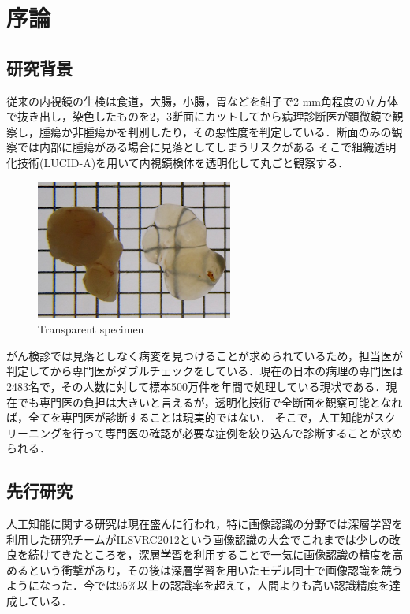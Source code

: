 \chapter{序論}
\label{chap_intro}

\section{研究背景}
従来の内視鏡の生検は食道，大腸，小腸，胃などを鉗子で2 mm角程度の立方体で抜き出し，染色したものを2，3断面にカットしてから病理診断医が顕微鏡で観察し，腫瘍か非腫瘍かを判別したり，その悪性度を判定している．断面のみの観察では内部に腫瘍がある場合に見落としてしまうリスクがある
そこで組織透明化技術(LUCID-A)\cite{sekitani2016ultraflexible}を用いて内視鏡検体を透明化して丸ごと観察する．

\begin{figure}[H]
	\centering
	\includegraphics[width=0.7\linewidth]{fig/chapter1/lucid}
	\caption{Transparent specimen}
	\label{fig:lucid}
\end{figure}

がん検診では見落としなく病変を見つけることが求められているため，担当医が判定してから専門医がダブルチェックをしている．現在の日本の病理の専門医は2483名\cite{pathology}で，その人数に対して標本500万件を年間で処理している現状である．現在でも専門医の負担は大きいと言えるが，透明化技術で全断面を観察可能となれば，全てを専門医が診断することは現実的ではない．
そこで，人工知能がスクリーニングを行って専門医の確認が必要な症例を絞り込んで診断することが求められる．

\section{先行研究}
人工知能に関する研究は現在盛んに行われ，特に画像認識の分野では深層学習\cite{lecun2015deep}を利用した研究チームがILSVRC2012という画像認識の大会でこれまでは少しの改良を続けてきたところを，深層学習を利用することで一気に画像認識の精度を高めるという衝撃があり，その後は深層学習を用いたモデル同士で画像認識を競うようになった．今では95\%以上の認識率を超えて，人間よりも高い認識精度を達成している．

